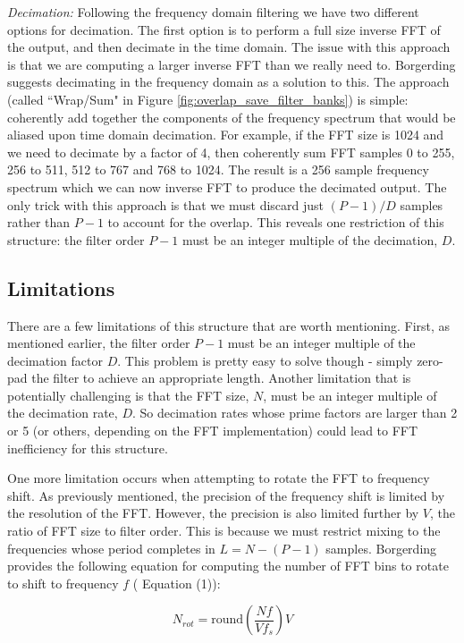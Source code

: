 \documentclass[12pt]{report}
\begin{document}
\emph{Decimation:} Following the frequency domain filtering we have two
different options for decimation. The first option is to perform a full size
inverse FFT of the output, and then decimate in the time domain. The issue with
this approach is that we are computing a larger inverse FFT than we really need
to. Borgerding suggests decimating in the frequency domain as a solution to this.
The approach (called ``Wrap/Sum" in Figure
\ref{fig:overlap_save_filter_banks}) is simple: coherently add together the
components of the frequency spectrum that would be aliased upon time domain
decimation. For example, if the FFT size is 1024 and we need to decimate by
a factor of 4, then coherently sum FFT samples 0 to 255, 256 to 511, 512 to 
767 and 768 to 1024.  The result is a 256 sample frequency
spectrum which we can now inverse FFT to produce the decimated output. The
only trick with this approach is that we must discard just $(P-1)/D$
samples rather than $P-1$ to account for the overlap.  This reveals one
restriction of this structure: the filter order $P-1$ must be an integer
multiple of the decimation, $D$.

\subsection{Limitations}
\label{sec:os_limitations}
There are a few limitations of this structure that are worth mentioning. First,
as mentioned earlier, the filter order $P-1$ must be an integer multiple of the
decimation factor $D$. This problem is pretty easy to solve though - simply
zero-pad the filter to achieve an appropriate length. Another limitation that
is potentially challenging is that the FFT size, $N$, must be an integer
multiple of the decimation rate, $D$. So decimation rates whose prime factors
are larger than 2 or 5 (or others, depending on the FFT implementation) could
lead to FFT inefficiency for this structure.

One more limitation occurs when attempting to rotate the FFT to frequency
shift.  As previously mentioned, the precision of the frequency shift is
limited by the resolution of the FFT. However, the precision is also limited
further by $V$, the ratio of FFT size to filter order. This is because we must
restrict mixing to the frequencies whose period completes in $L=N-(P-1)$
samples. Borgerding provides the following equation for computing the number of
FFT bins to rotate to shift to frequency $f$ (\cite{Borgerding1} Equation (1)):

\begin{equation}
    N_{rot} = \text{round}\left( \frac{Nf}{Vf_s} \right) V
\end{equation}
\end{document}
